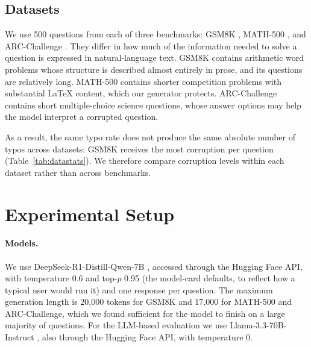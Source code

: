\documentclass[11pt]{article}
\begin{document}
\subsection{Datasets}

We use 500 questions from each of three benchmarks: GSM8K \citep{cobbe2021},
MATH-500 \citep{hendrycks2021,lightman2024}, and ARC-Challenge
\citep{clark2018}. They differ in how much of the information needed to solve a
question is expressed in natural-language text. GSM8K contains arithmetic word
problems whose structure is described almost entirely in prose, and its
questions are relatively long. MATH-500 contains shorter competition problems
with substantial \LaTeX{} content, which our generator protects. ARC-Challenge
contains short multiple-choice science questions, whose answer options may help
the model interpret a corrupted question.

As a result, the same typo rate does not produce the same absolute number of
typos across datasets: GSM8K receives the most corruption per question
(Table~\ref{tab:datastats}). We therefore compare corruption levels within each
dataset rather than across benchmarks.

\begin{table}[t]
\centering
\footnotesize
\setlength{\tabcolsep}{3.5pt}
\resizebox{\columnwidth}{!}{}
\caption{Dataset and corruption statistics over the nine corrupted conditions
($r\in\{25,50,75\}\%$, $\rho\in\{10,40,70\}\%$), first 500 questions of GSM8K
and ARC-Challenge and all of MATH-500. \emph{Eligible words} are those the
generator may corrupt, after protected spans, single-character words and
function words are removed; the typo rate applies to them, and real-word ratios
are pooled over all corrupted words.}
\label{tab:datastats}
\end{table}

\section{Experimental Setup}
\label{sec:setup}

\paragraph{Models.}
We use DeepSeek-R1-Distill-Qwen-7B \citep{deepseekr1}, accessed through the
Hugging Face API, with temperature 0.6 and top-$p$ 0.95 (the model-card
defaults, to reflect how a typical user would run it) and one response per
question. The maximum generation length is 20{,}000 tokens for GSM8K and
17{,}000 for MATH-500 and ARC-Challenge, which we found sufficient for the model
to finish on a large majority of questions. For the LLM-based evaluation we use
Llama-3.3-70B-Instruct \citep{llama3}, also through the Hugging Face API, with
temperature 0.
\end{document}
